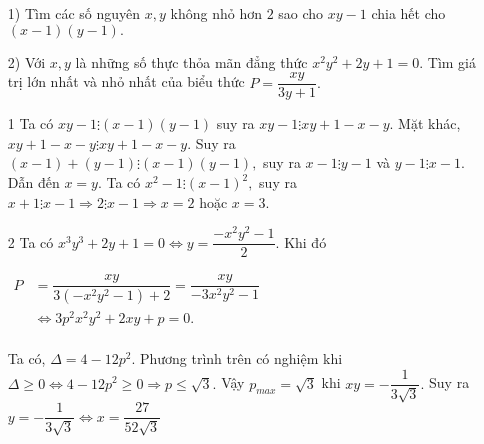 \begin{ex}
{\begin{enumerate}
    \end{enumerate}
    }
\end{ex}

\begin{ex}%

\hfill
    \begin{enumerate}
        \item[1)] Tìm các số nguyên  $x,y$ không nhỏ hơn $2$ sao cho   $xy-1$  chia hết cho  $(x-1)(y-1).$
        \item[2)] Với  $x,y$ là những số thực thỏa mãn đẳng thức $x^2y^2+2y+1=0.$ Tìm giá trị lớn nhất và 
nhỏ nhất của biểu thức  $P=\dfrac{xy}{3y+1}.$
    \end{enumerate}
\loigiai
    {
    \begin{enumerate}
        \item[1]  Ta có $xy-1\vdots (x-1)(y-1)$ suy ra $xy-1 \vdots xy+1-x-y.$ Mặt khác, $xy+1-x-y \vdots xy+1-x-y.$ Suy ra $(x-1)+(y-1) \vdots (x-1)(y-1),$ suy ra $x-1 \vdots y-1$ và $y-1 \vdots x-1.$ Dẫn đến $x=y.$ Ta có $x^2-1 \vdots (x-1)^2,$ suy ra $x+1\vdots x-1 \Rightarrow 2 \vdots x-1 \Rightarrow x=2$ hoặc $x=3.$        
        \item[2]  Ta có $x^3y^3+2y+1=0 \Leftrightarrow y = \dfrac{-x^2y^2-1}{2}.$ Khi đó 

$\begin{array}{ll}
P &= \dfrac{xy}{3(-x^2y^2-1)+2} = \dfrac{xy}{-3x^2y^2-1} \\
&\Leftrightarrow 3p^2x^2y^2+2xy+p=0.\\
\end{array}$

Ta có, $\Delta = 4-12p^2$. Phương trình trên có nghiệm khi $\Delta \ge 0 \Leftrightarrow 4-12p^2 \ge 0 \Rightarrow p \le \sqrt{3}.$ Vậy $p_{max} = \sqrt{3}$ khi $xy=-\dfrac{1}{3\sqrt{3}}.$ Suy ra $y = -\dfrac{1}{3\sqrt{3}} \Leftrightarrow x = \dfrac{27}{52\sqrt{3}}$
    \end{enumerate}
    }
\end{ex}

